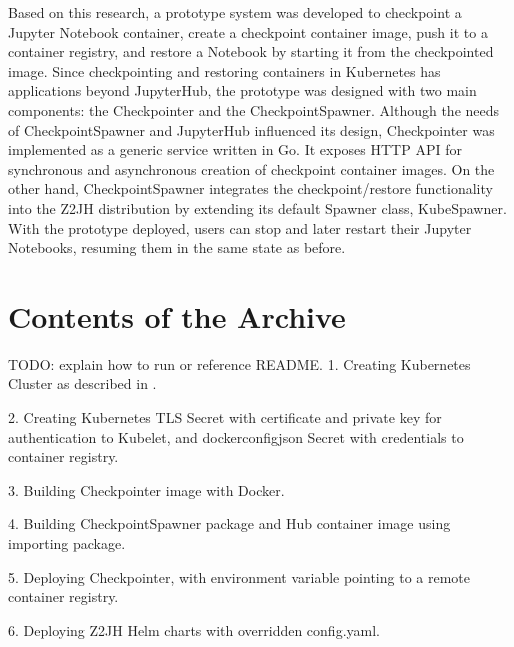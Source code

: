 \documentclass[
  digital,     %
  oneside,     %
  nosansbold,  %
  nocolorbold, %
  lof,         %
  nolot,         %
]{fithesis4}
\begin{document}
Based on this research, a prototype system was developed to checkpoint a Jupyter Notebook container, create a checkpoint container image, push it to a container registry, and restore a Notebook by starting it from the checkpointed image. Since checkpointing and restoring containers in Kubernetes has applications beyond JupyterHub, the prototype was designed with two main components: the Checkpointer and the CheckpointSpawner. Although the needs of CheckpointSpawner and JupyterHub influenced its design, Checkpointer was implemented as a generic service written in Go. It exposes HTTP API for synchronous and asynchronous creation of checkpoint container images. On the other hand, CheckpointSpawner integrates the checkpoint/restore functionality into the Z2JH distribution by extending its default Spawner class, KubeSpawner. With the prototype deployed, users can stop and later restart their Jupyter Notebooks, resuming them in the same state as before.



\printbibliography[heading=bibintoc] %



\appendix %
\chapter{Contents of the Archive}
\label{apendix}

TODO: explain how to run or reference README.
1. Creating Kubernetes Cluster as described in .

2. Creating Kubernetes TLS Secret with certificate and private key for authentication to Kubelet, and dockerconfigjson Secret with credentials to container registry.

3. Building Checkpointer image with Docker.

4. Building CheckpointSpawner package and Hub container image using importing package.

5. Deploying Checkpointer, with environment variable pointing to a remote container registry.

6. Deploying Z2JH Helm charts with overridden config.yaml.
\end{document}
